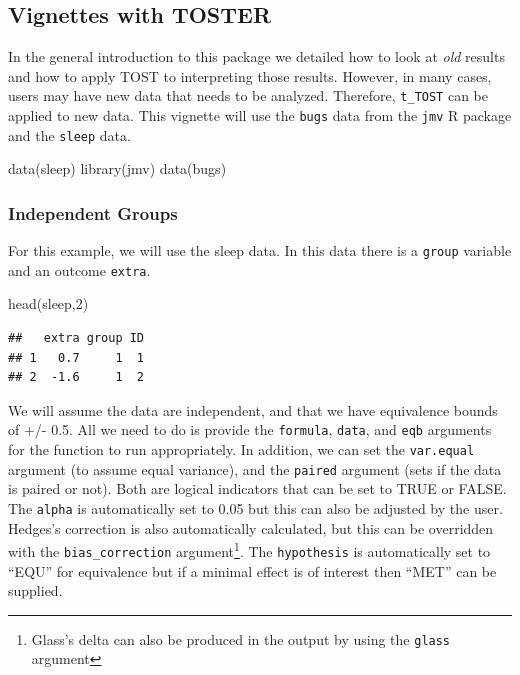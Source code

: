\documentclass[]{interact}
\theoremstyle{plain}%
\theoremstyle{definition}
\theoremstyle{remark}
\newenvironment{Shaded}{\begin{snugshade}}{\end{snugshade}}
\newcommand{\DecValTok}[1]{\textcolor[rgb]{0.00,0.00,0.81}{#1}}
\newcommand{\FunctionTok}[1]{\textcolor[rgb]{0.00,0.00,0.00}{#1}}
\newcommand{\NormalTok}[1]{#1}
\newcommand{\StringTok}[1]{\textcolor[rgb]{0.31,0.60,0.02}{#1}}
\begin{document}
\newpage

\hypertarget{vignettes-with-toster}{%
\subsection{Vignettes with TOSTER}\label{vignettes-with-toster}}

In the general introduction to this package we detailed how to look at
\emph{old} results and how to apply TOST to interpreting those results.
However, in many cases, users may have new data that needs to be
analyzed. Therefore, \texttt{t\_TOST} can be applied to new data. This
vignette will use the \texttt{bugs} data from the \texttt{jmv} R package
and the \texttt{sleep} data.

\begin{Shaded}
\begin{Highlighting}[]
\FunctionTok{data}\NormalTok{(}\StringTok{\textquotesingle{}sleep\textquotesingle{}}\NormalTok{)}
\FunctionTok{library}\NormalTok{(jmv)}
\FunctionTok{data}\NormalTok{(}\StringTok{\textquotesingle{}bugs\textquotesingle{}}\NormalTok{)}
\end{Highlighting}
\end{Shaded}

\hypertarget{independent-groups}{%
\subsubsection{Independent Groups}\label{independent-groups}}

For this example, we will use the sleep data. In this data there is a
\texttt{group} variable and an outcome \texttt{extra}.

\begin{Shaded}
\begin{Highlighting}[]
\FunctionTok{head}\NormalTok{(sleep,}\DecValTok{2}\NormalTok{)}
\end{Highlighting}
\end{Shaded}

\begin{verbatim}
##   extra group ID
## 1   0.7     1  1
## 2  -1.6     1  2
\end{verbatim}

We will assume the data are independent, and that we have equivalence
bounds of +/- 0.5. All we need to do is provide the \texttt{formula},
\texttt{data}, and \texttt{eqb} arguments for the function to run
appropriately. In addition, we can set the \texttt{var.equal} argument
(to assume equal variance), and the \texttt{paired} argument (sets if
the data is paired or not). Both are logical indicators that can be set
to TRUE or FALSE. The \texttt{alpha} is automatically set to 0.05 but
this can also be adjusted by the user. Hedges's correction
\citep{hedges_bias} is also automatically calculated, but this can be
overridden with the \texttt{bias\_correction} argument\footnote{Glass's
  delta can also be produced in the output by using the \texttt{glass}
  argument}. The \texttt{hypothesis} is automatically set to ``EQU'' for
equivalence but if a minimal effect is of interest then ``MET'' can be
supplied.
\end{document}
